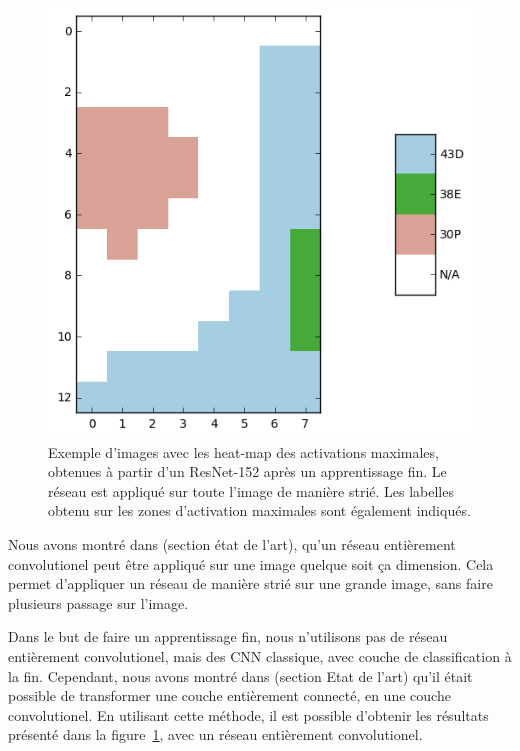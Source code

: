 \begin{figure}
\begin{minipage}[c]{.33\linewidth}
  \end{minipage} \hfill
  \begin{minipage}[c]{.32\linewidth}
    \includegraphics[width=\linewidth]{figures/sample3_labels.png}
  \end{minipage}


	\caption{Exemple d'images avec les heat-map des activations maximales, obtenues à partir d'un ResNet-152 après un apprentissage fin. Le réseau est appliqué sur toute l'image de manière strié. Les labelles obtenu sur les zones d'activation maximales sont également indiqués.\label{fig:heatmaps}}
	
\end{figure}

Nous avons montré dans (section état de l'art), qu'un réseau entièrement convolutionel peut être appliqué sur une image quelque soit ça dimension. Cela permet d'appliquer un réseau de manière strié sur une grande image, sans faire plusieurs passage sur l'image.

Dans le but de faire un apprentissage fin, nous n'utilisons pas de réseau entièrement convolutionel, mais des CNN classique, avec couche de classification à la fin. Cependant, nous avons montré dans (section Etat de l'art) qu'il était possible de transformer une couche entièrement connecté, en une couche convolutionel. En utilisant cette méthode, il est possible d'obtenir les résultats présenté dans la figure~\ref{fig:heatmaps}, avec un réseau entièrement convolutionel.

